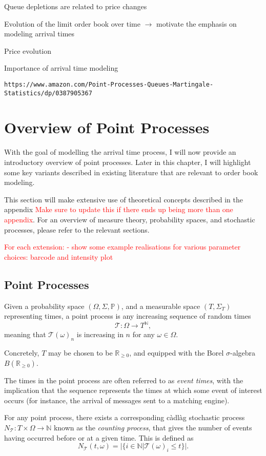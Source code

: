 \documentclass[honours,12pt]{unswthesis}
\numberwithin{equation}{section}
\begin{document}
Queue depletions are related to price changes \cite{BouchaudEtAl}

Evolution of the limit order book over time $\to$ motivate the emphasis on modeling arrival times

Price evolution

Importance of arrival time modeling

\texttt{https://www.amazon.com/Point-Processes-Queues-Martingale-Statistics/dp/0387905367}

\section{Overview of Point Processes}
With the goal of modelling the arrival time process, I will now provide an introductory overview of point processes. Later in this chapter, I will highlight some key variants described in existing literature that are relevant to order book modeling.

This section will make extensive use of theoretical concepts described in the appendix \textcolor{red}{Make sure to update this if there ends up being more than one appendix}. For an overview of measure theory, probability spaces, and stochastic processes, please refer to the relevant sections.

\textcolor{red}{
For each extension:
- show some example realisations for various parameter choices: barcode and intensity plot
}


\subsection{Point Processes}
Given a probability space $(\Omega,\Sigma,\mathbb P)$, and a measurable space $(T,\Sigma_T)$ representing times, a point process is any increasing sequence of random times $$\mathcal T : \Omega\to T^\mathbb{N},$$
meaning that $\mathcal{T}(\omega)_n$ is increasing in $n$ for any $\omega\in\Omega$.

Concretely, $T$ may be chosen to be $\mathbb{R}_{\geq 0}$, and equipped with the Borel $\sigma$-algebra $B\left(\mathbb{R}_{\geq 0}\right)$.

The times in the point process are often referred to as \textit{event times}, with the implication that the sequence represents the times at which some event of interest occurs (for instance, the arrival of messages sent to a matching engine).

{\noindent}For any point process, there exists a corresponding càdlàg stochastic process $N_{\mathcal T}:T\times\Omega\to\mathbb{N}$ known as the \textit{counting process}, that gives the number of events having occurred before or at a given time. This is defined as
$$N_{\mathcal T}(t,\omega) = \vert \{i\in\mathbb N \vert \mathcal{T}(\omega)_i \leq t\} \vert.$$
\end{document}

